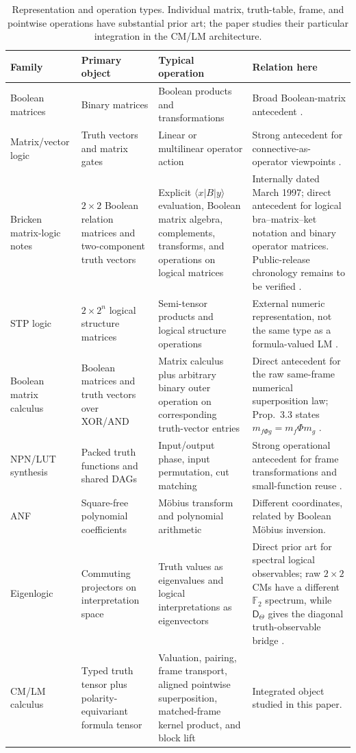 \documentclass[11pt]{article}
\theoremstyle{definition}
\theoremstyle{remark}
\newcommand{\F}{\mathbb F}
\begin{document}
\begin{table}[ht]
\centering\footnotesize
\begin{tabular}{L{.15\linewidth}L{.20\linewidth}L{.22\linewidth}L{.31\linewidth}}
\toprule
Family & Primary object & Typical operation & Relation here\\
\midrule
Boolean matrices & Binary matrices & Boolean products and transformations & Broad Boolean-matrix antecedent \cite{Edwards1972}.\\
Matrix/vector logic & Truth vectors and matrix gates & Linear or multilinear operator action & Strong antecedent for connective-as-operator viewpoints \cite{Stern1988,Mizraji1992,Mizraji2008}.\\
Bricken matrix-logic notes & $2\times2$ Boolean relation matrices and two-component truth vectors & Explicit $\langle x|B|y\rangle$ evaluation, Boolean matrix algebra, complements, transforms, and operations on logical matrices & Internally dated March 1997; direct antecedent for logical bra--matrix--ket notation and binary operator matrices.  Public-release chronology remains to be verified \cite{Bricken1997}.\\
STP logic & $2\times2^n$ logical structure matrices & Semi-tensor products and logical structure operations & External numeric representation, not the same type as a formula-valued LM \cite{ChengQi2010,ZhaoSTP}.\\
Boolean matrix calculus & Boolean matrices and truth vectors over XOR/AND & Matrix calculus plus arbitrary binary outer operation on corresponding truth-vector entries & Direct antecedent for the raw same-frame numerical superposition law; Prop.~3.3 states $m_{f\Phi g}=m_f\Phi m_g$ \cite{Cheng2011}.\\
NPN/LUT synthesis & Packed truth functions and shared DAGs & Input/output phase, input permutation, cut matching & Strong operational antecedent for frame transformations and small-function reuse \cite{Mishchenko2006,Zhou2019}.\\
ANF & Square-free polynomial coefficients & M\"obius transform and polynomial arithmetic & Different coordinates, related by Boolean M\"obius inversion.\\
Eigenlogic & Commuting projectors on interpretation space & Truth values as eigenvalues and logical interpretations as eigenvectors & Direct prior art for spectral logical observables; raw $2\times2$ CMs have a different $\F_2$ spectrum, while $\mathsf D_\Theta$ gives the diagonal truth-observable bridge \cite{Toffano2020,DuboisToffano2016}.\\
CM/LM calculus & Typed truth tensor plus polarity-equivariant formula tensor & Valuation, pairing, frame transport, aligned pointwise superposition, matched-frame kernel product, and block lift & Integrated object studied in this paper.\\
\bottomrule
\end{tabular}
\caption{Representation and operation types.  Individual matrix, truth-table, frame, and pointwise operations have substantial prior art; the paper studies their particular integration in the CM/LM architecture.}
\label{tab:related}
\end{table}
\end{document}
